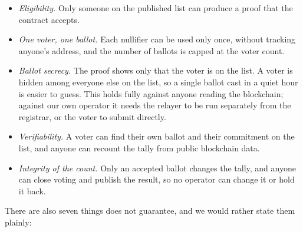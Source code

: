 \begin{itemize}
  \item \emph{Eligibility.} Only someone on the published list can produce a
        proof that the contract accepts.
  \item \emph{One voter, one ballot.} Each nullifier can be used only once,
        without tracking anyone's address, and the number of ballots is capped
        at the voter count.
  \item \emph{Ballot secrecy.} The proof shows only that the voter is on the
        list. A voter is hidden among everyone else on the list, so a single
        ballot cast in a quiet hour is easier to guess. This holds fully
        against anyone reading the blockchain; against our own operator it
        needs the relayer to be run separately from the registrar, or the
        voter to submit directly.
  \item \emph{Verifiability.} A voter can find their own ballot and their
        commitment on the list, and anyone can recount the tally from public
        blockchain data.
  \item \emph{Integrity of the count.} Only an accepted ballot changes the
        tally, and anyone can close voting and publish the result, so no
        operator can change it or hold it back.
\end{itemize}

There are also seven things \projectname{} does not guarantee, and we would
rather state them plainly:

